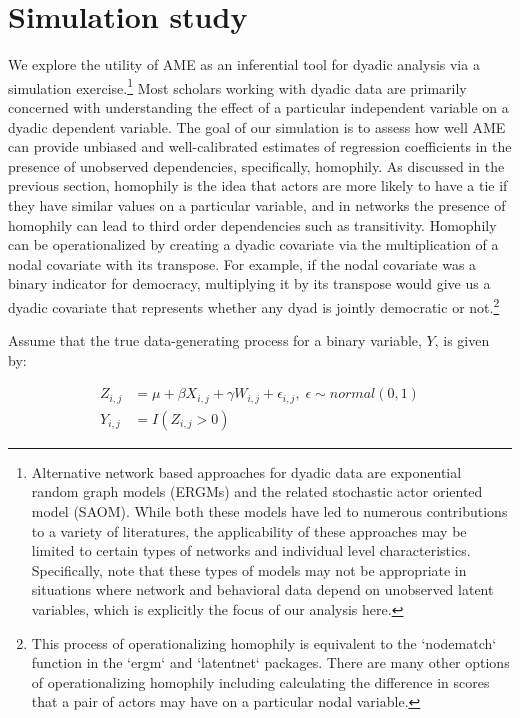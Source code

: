 \section{\textbf{Simulation study}}

We explore the utility of AME as an inferential tool for dyadic analysis via a simulation exercise.\footnote{Alternative network based approaches for dyadic data are exponential random graph models (ERGMs) and the related stochastic actor oriented model (SAOM). While both these models have led to numerous contributions to a variety of literatures, the applicability of these approaches may be limited to certain types of networks and individual level characteristics. Specifically, \citet{block:etal:2017} note that these types of  models may not be appropriate in situations where network and behavioral data depend on unobserved latent variables, which is explicitly the focus of our analysis here.} Most scholars working with dyadic data are primarily concerned with understanding the effect of a particular independent variable on a dyadic dependent variable. The goal of our simulation is to assess how well AME can provide unbiased and well-calibrated estimates of regression coefficients in the presence of unobserved dependencies, specifically, homophily. As discussed in the previous section, homophily is the idea that actors are more likely to have a tie if they have similar values on a particular variable, and in networks the presence of homophily can lead to third order dependencies such as transitivity. Homophily can be operationalized by creating a dyadic covariate via the multiplication of a nodal covariate with its transpose. For example, if the nodal covariate was a binary indicator for democracy, multiplying it by its transpose would give us a dyadic covariate that represents whether any dyad is jointly democratic or not.\footnote{This process of operationalizing homophily is equivalent to the `nodematch` function in the `ergm` and `latentnet` packages. There are many other options of operationalizing homophily including calculating the difference in scores that a pair of actors may have on a particular nodal variable.}

Assume that the true data-generating process for a binary variable, $Y$, is given by:

\begin{align}
	Z_{i,j} &=  \mu + \beta X_{i,j} + \gamma W_{i,j} + \epsilon_{i,j}, \; \epsilon \sim normal(0,1) \nonumber \\
	Y_{i,j} &= I(Z_{i,j} > 0)
	\label{eqn:sim}
\end{align}

